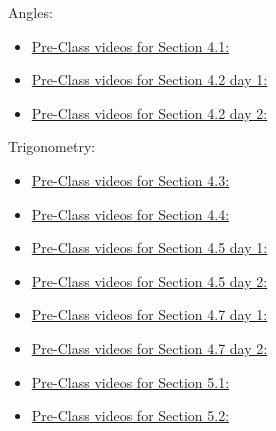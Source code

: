 \documentclass[12pt]{article}
\newcommand{\videoLink}[2]{%
  \href{#2}{Pre-Class videos for #1:}
}
\begin{document}
Angles:
\begin{itemize}
\item  \videoLink{Section 4.1}{https://www.youtube.com/playlist?list=PLYHZK3b8UFw3HtpDsf1SA0Znm5\_7bAGBY}
\item  \videoLink{Section 4.2 day 1}{https://www.youtube.com/playlist?list=PLYHZK3b8UFw2_C72_BEthTH-k3sKuNAEb}
\item  \videoLink{Section 4.2 day 2}{https://www.youtube.com/playlist?list=PLYHZK3b8UFw1pcxMutFvlZct58eGZRjlC}
\end{itemize}


Trigonometry:
\begin{itemize}
\item \videoLink{Section 4.3}{https://www.youtube.com/playlist?list=PLYHZK3b8UFw2K5Q_epS1Wi1hezUGCYwtP}
\item \videoLink{Section 4.4}{https://www.youtube.com/playlist?list=PLYHZK3b8UFw2OmnPlWMPeyRScOjE2Rk4C}
\item \videoLink{Section 4.5 day 1}{https://www.youtube.com/playlist?list=PLYHZK3b8UFw0U_iMosD8HZraus76s5k2i}
\item \videoLink{Section 4.5 day 2}{https://www.youtube.com/playlist?list=PLYHZK3b8UFw0U_iMosD8HZraus76s5k2i}
\item \videoLink{Section 4.7 day 1}{https://www.youtube.com/playlist?list=PLYHZK3b8UFw084fqUEZ7lpLyl4MJiCOwu}
\item \videoLink{Section 4.7 day 2}{https://www.youtube.com/playlist?list=PLYHZK3b8UFw0JZy4oRGwxyv_LaTgWK5r2}
\item \videoLink{Section 5.1}{https://www.youtube.com/playlist?list=PLYHZK3b8UFw0Afc951bZjITtow-fxztxp}
\item \videoLink{Section 5.2}{https://www.youtube.com/playlist?list=PLYHZK3b8UFw3NgZa9wBc8k8LS5w45veeB}
\end{itemize}
\end{document}
